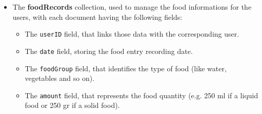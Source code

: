 \begin{itemize}[nosep] %
    \item The \textbf{foodRecords} collection, used to manage the food informations for the users, with each document having the following fields:
    \begin{itemize}[nosep]
        \item The \texttt{userID} field, that links those data with the corresponding user.
        \item The \texttt{date} field, storing the food entry recording date.
        \item The \texttt{foodGroup} field, that identifies the type of food (like water, vegetables and so on).
        \item The \texttt{amount} field, that represents the food quantity (e.g. 250 ml if a liquid food or 250 gr if a solid food).
    \end{itemize}
\end{itemize}


